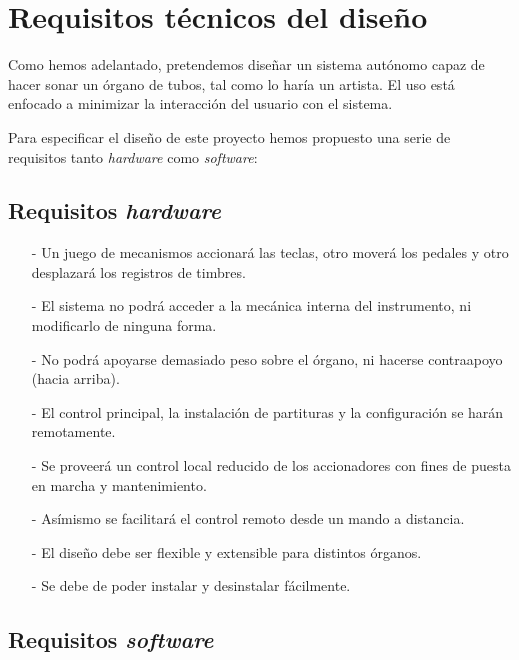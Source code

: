 \chapter{Requisitos técnicos del diseño}
\label{cap:capitulo_2}

Como hemos adelantado, pretendemos diseñar un sistema autónomo capaz de hacer sonar un órgano de tubos, tal como lo haría un artista. El uso está enfocado a minimizar la interacción del usuario con el sistema. 

Para especificar el diseño de este proyecto hemos propuesto una serie de requisitos tanto \textit{hardware} como \textit{software}:

\section{Requisitos \textit{hardware}}

\begin{itemize}
	
	\item[-] Un juego de mecanismos accionará las teclas, otro moverá los pedales y otro desplazará los registros de timbres.
	
	\item[-] El sistema no podrá acceder a la mecánica interna del instrumento, ni modificarlo de ninguna forma.
	
	\item[-] No podrá apoyarse demasiado peso sobre el órgano, ni hacerse contraapoyo (hacia arriba).
	
	\item[-] El control principal, la instalación de partituras y la configuración se harán remotamente.
	
	\item[-] Se proveerá un control local reducido de los accionadores con fines de puesta en marcha y mantenimiento.
	
	\item[-] Asímismo se facilitará el control remoto desde un mando a distancia.
	
	\item[-] El diseño debe ser flexible y extensible para distintos órganos.
	
	\item[-] Se debe de poder instalar y desinstalar fácilmente.
	
\end{itemize}

\section{Requisitos \textit{software}}

